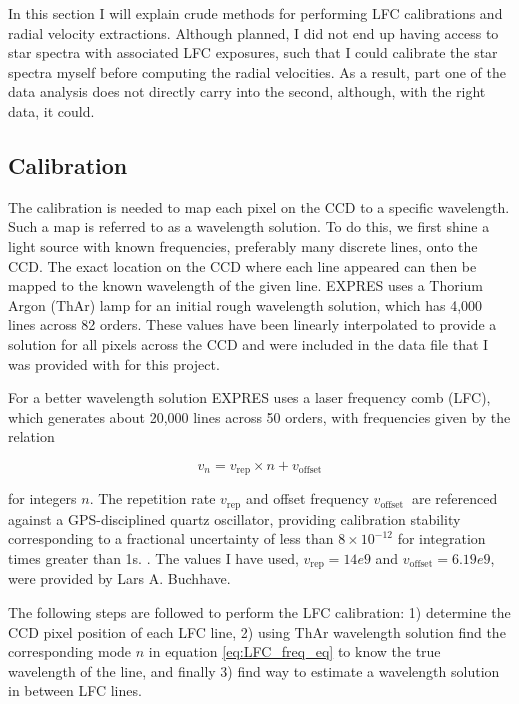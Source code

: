 In this section I will explain crude methods for performing LFC calibrations and radial velocity extractions. Although planned, I did not end up having access to star spectra with associated LFC exposures, such that I could calibrate the star spectra myself before computing the radial velocities. As a result, part one of the data analysis does not directly carry into the second, although, with the right data, it could.

\subsection{Calibration} 

    The calibration is needed to map each pixel on the CCD to a specific wavelength. Such a map is referred to as a wavelength solution. To do this, we first shine a light source with known frequencies, preferably many discrete lines, onto the CCD. The exact location on the CCD where each line appeared can then be mapped to the known wavelength of the given line. EXPRES uses a Thorium Argon (ThAr) lamp for an initial rough wavelength solution, which has 4,000 lines across 82 orders. These values have been linearly interpolated to provide a solution for all pixels across the CCD and were included in the data file that I was provided with for this project.
    
    For a better wavelength solution EXPRES uses a laser frequency comb (LFC), which generates about 20,000 lines across 50 orders, with frequencies given by the relation

    \begin{equation}
        \label{eq:LFC_freq_eq}
        v_{n}=v_{\text{rep}} \times n+v_{\text{offset}}
    \end{equation}

    for integers $n$. The repetition rate $v_{\text {rep}}$ and offset frequency $v_{\text {offset }}$ are referenced against a GPS-disciplined quartz oscillator, providing calibration stability corresponding to a fractional uncertainty of less than $8 \times 10^{-12}$ for integration times greater than 1s. \cite{first_RV_from_EXPRES}. The values I have used, $v_{\text{rep}} = 14e9$ and $v_{\text{offset}} = 6.19e9$, were provided by Lars A. Buchhave.
    
    The following steps are followed to perform the LFC calibration: 1) determine the CCD pixel position of each LFC line, 2) using ThAr wavelength solution find the corresponding mode $n$ in equation \ref{eq:LFC_freq_eq} to know the true wavelength of the line, and finally 3) find way to estimate a wavelength solution in between LFC lines. 

